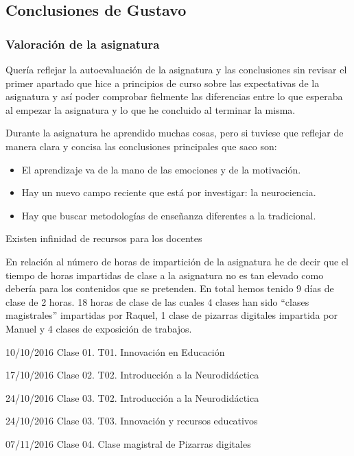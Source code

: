 

\subsection{Conclusiones de Gustavo}
\begin{leftbar}{\guscolor}
\subsubsection{Valoración de la asignatura}

Quería reflejar la autoevaluación de la asignatura y las conclusiones sin revisar el primer apartado que hice a principios de curso sobre las expectativas de la asignatura y así poder comprobar fielmente las diferencias entre lo que esperaba al empezar la asignatura y lo que he concluido al terminar la misma.

Durante la asignatura he aprendido muchas cosas, pero si tuviese que reflejar de manera clara y concisa las conclusiones principales que saco son:

\begin{itemize}
\item El aprendizaje va de la mano de las emociones y de la motivación.
\item Hay un nuevo campo reciente que está por investigar: la neurociencia.
\item Hay que buscar metodologías de enseñanza diferentes a la tradicional.
\end{itemize}

Existen infinidad de recursos para los docentes

En relación al número de horas de impartición de la asignatura he de decir que el tiempo de horas impartidas de clase a la asignatura no es tan elevado como debería para los contenidos que se pretenden. En total hemos tenido 9 días de clase de 2 horas. 18 horas de clase de las cuales 4 clases han sido “clases magistrales” impartidas por Raquel, 1 clase de pizarras digitales impartida por Manuel y 4 clases de exposición de trabajos.

10/10/2016 Clase 01. T01. Innovación en Educación

17/10/2016 Clase 02. T02. Introducción a la Neurodidáctica

24/10/2016 Clase 03. T02. Introducción a la Neurodidáctica

24/10/2016 Clase 03. T03. Innovación y recursos educativos

07/11/2016 Clase 04. Clase magistral de Pizarras digitales


\end{leftbar}
